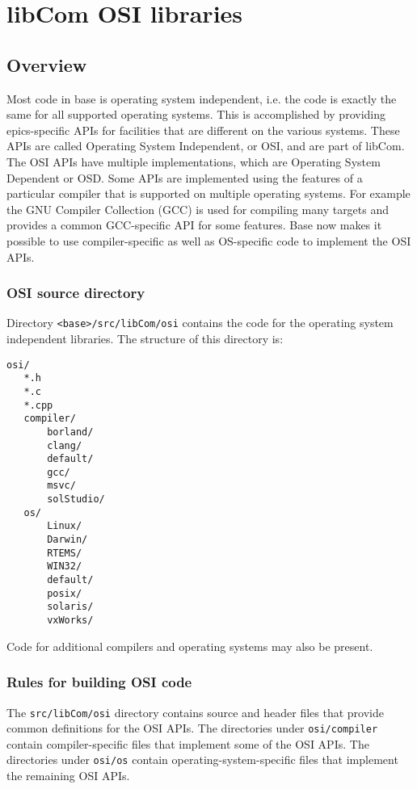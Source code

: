 \chapter{libCom OSI libraries}

\section{Overview}

Most code in base is operating system independent, i.e. the code is exactly the same for all supported operating systems. 
This is accomplished by providing epics-specific APIs for facilities that are different on the various systems.
These APIs are called Operating System Independent, or OSI, and are part of libCom.
The OSI APIs have multiple implementations, which are Operating System Dependent or OSD.
Some APIs are implemented using the features of a particular compiler that is supported on multiple operating systems.
For example the GNU Compiler Collection (GCC) is used for compiling many targets and provides a common GCC-specific API for some features.
Base now makes it possible to use compiler-specific as well as OS-specific code to implement the OSI APIs.

\subsection{OSI source directory}

Directory \verb|<base>/src/libCom/osi| contains the code for the operating system independent libraries.
The structure of this directory is:

\begin{verbatim}
osi/
   *.h
   *.c
   *.cpp
   compiler/
       borland/
       clang/
       default/
       gcc/
       msvc/
       solStudio/
   os/
       Linux/
       Darwin/
       RTEMS/
       WIN32/
       default/
       posix/
       solaris/
       vxWorks/
\end{verbatim}

Code for additional compilers and operating systems may also be present.

\subsection{Rules for building OSI code}

The \verb|src/libCom/osi| directory contains source and header files that provide common definitions for the OSI APIs.
The directories under \verb|osi/compiler| contain compiler-specific files that implement some of the OSI APIs.
The directories under \verb|osi/os| contain operating-system-specific files that implement the remaining OSI APIs.

